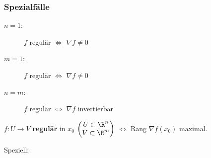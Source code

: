 \subsubsection{Spezialfälle}
\begin{description}
	\item[$n=1$:] $f$ regulär $\iff$ $\nabla f \neq 0$
	\item[$m=1$:] $f$ regulär $\iff$ $\nabla f \neq 0$
	\item[$n=m$:] $f$ regulär $\iff$ $\nabla f$ invertierbar
\end{description}
\begin{def*}[note = regulär , index = regulär]
	$f: U \rightarrow V$ \textbf{regulär} in $x_0$ $\begin{pmatrix} U \subset \R^n \\ V \subset \R^m \end{pmatrix}$ $\iff$ Rang $\nabla f( x_0 )$ maximal.
\end{def*}
Speziell: 

